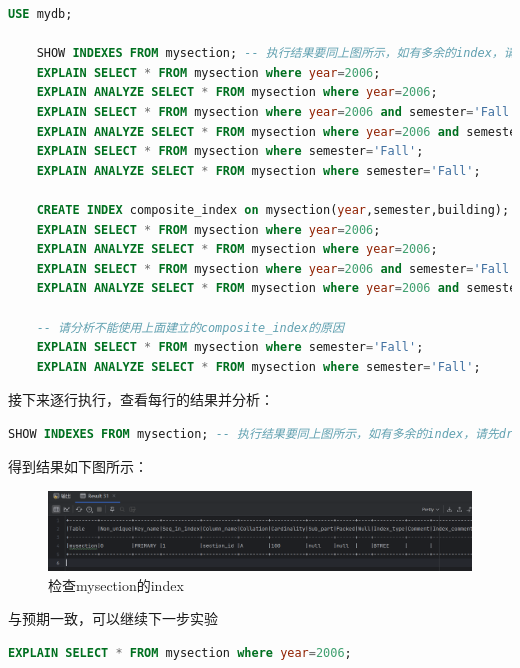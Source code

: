 \documentclass{article}
\begin{document}
	\begin{lstlisting}[language=sql, title=索引对查询性能的影响 - 总, tabsize=4]
	USE mydb;
	
	SHOW INDEXES FROM mysection; -- 执行结果要同上图所示，如有多余的index，请先drop删除掉
	EXPLAIN SELECT * FROM mysection where year=2006;
	EXPLAIN ANALYZE SELECT * FROM mysection where year=2006;
	EXPLAIN SELECT * FROM mysection where year=2006 and semester='Fall';
	EXPLAIN ANALYZE SELECT * FROM mysection where year=2006 and semester='Fall';
	EXPLAIN SELECT * FROM mysection where semester='Fall';
	EXPLAIN ANALYZE SELECT * FROM mysection where semester='Fall';
	
	CREATE INDEX composite_index on mysection(year,semester,building);
	EXPLAIN SELECT * FROM mysection where year=2006;
	EXPLAIN ANALYZE SELECT * FROM mysection where year=2006;
	EXPLAIN SELECT * FROM mysection where year=2006 and semester='Fall';
	EXPLAIN ANALYZE SELECT * FROM mysection where year=2006 and semester='Fall';
	
	-- 请分析不能使用上面建立的composite_index的原因
	EXPLAIN SELECT * FROM mysection where semester='Fall';
	EXPLAIN ANALYZE SELECT * FROM mysection where semester='Fall';	
	\end{lstlisting}
	
	接下来逐行执行，查看每行的结果并分析：
	
	\begin{lstlisting}[language=sql, title=索引对查询性能的影响, tabsize=4]
	SHOW INDEXES FROM mysection; -- 执行结果要同上图所示，如有多余的index，请先drop删除掉
	\end{lstlisting}
	
	得到结果如下图所示：
	
	\begin{figure}[H]
		\centering
		\includegraphics[width=13cm]{./images/4.检查mysection的index.png}
		\caption{检查mysection的index}
	\end{figure}
	
	与预期一致，可以继续下一步实验
	
	\begin{lstlisting}[language=sql, title=索引对查询性能的影响, tabsize=4]
	EXPLAIN SELECT * FROM mysection where year=2006;
	\end{lstlisting}
	
\end{document}
